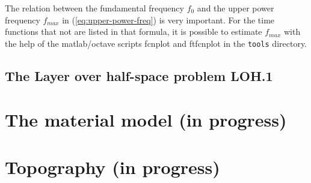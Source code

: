 \documentclass[11pt]{report}
\begin{document}
The relation between the fundamental frequency $f_0$ and the upper power
frequency $f_{max}$ in (\ref{eq:upper-power-freq}) is very important. For the time functions that
not are listed in that formula, it is possible to estimate
$f_{max}$ with the help of the matlab/octave scripts fcnplot and ftfcnplot in the {\tt tools}
directory. 

\section{The Layer over half-space problem LOH.1}


\chapter{The material model (in progress)} \label{sec:material}

\chapter{Topography (in progress)} \label{sec:topography}


\end{document}
